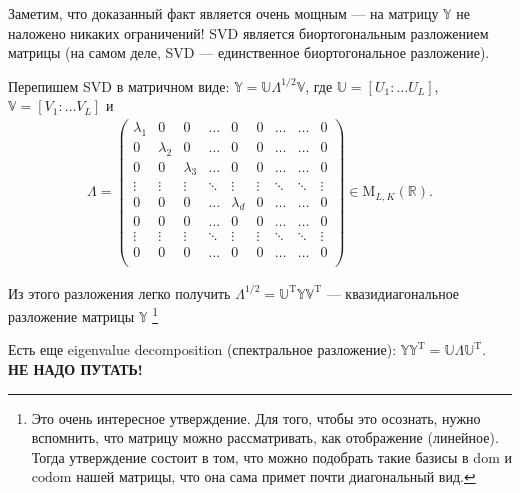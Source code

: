 Заметим, что доказанный факт является очень мощным --- на матрицу $\mathbb Y$ не наложено никаких ограничений!
SVD является биортогональным разложением матрицы (на самом деле, SVD --- единственное биортогональное разложение).

Перепишем SVD в матричном виде: $\mathbb Y = \mathbb U \Lambda^{1/2} \mathbb V$, где $\mathbb U = [U_1 \colon \ldots U_L]$, $\mathbb V = [V_1 \colon \ldots V_L]$ и
\begin{gather*}
    \Lambda = 
    \begin{pmatrix}
        \lambda_1 & 0 & 0 &\ldots & 0 & 0 & \ldots & \ldots & 0\\
        0 & \lambda_2 & 0 &\ldots & 0 & 0 & \ldots & \ldots & 0\\
        0 & 0 & \lambda_3 &\ldots & 0 & 0 & \ldots & \ldots & 0\\
        \vdots & \vdots & \vdots & \ddots & \vdots & \vdots & \ddots & \ddots & \vdots \\
        0 & 0 & 0 & \ldots & \lambda_d & 0 &  \ldots & \ldots & 0\\
        0 & 0 & 0 & \ldots & 0 & 0 &  \ldots & \ldots & 0\\
        \vdots & \vdots & \vdots & \ddots & \vdots & \vdots & \ddots & \ddots & \vdots \\
        0 & 0 & 0 & \ldots & 0 & 0 &  \ldots & \ldots & 0\\
    \end{pmatrix} \in \mathrm M_{L, K} (\mathbb R).
\end{gather*}

Из этого разложения легко получить $\Lambda^{1/2} = \mathbb U^\mathrm T \mathbb Y \mathbb V^\mathrm T$ --- квазидиагональное разложение матрицы $\mathbb Y$ \footnote{Это очень интересное утверждение.
    Для того, чтобы это осознать, нужно вспомнить, что матрицу можно рассматривать, как отображение (линейное). Тогда утверждение состоит в том, что можно подобрать такие базисы в $\mathrm {dom}$ и $\mathrm {codom}$
нашей матрицы, что она сама примет почти диагональный вид.}

Есть еще eigenvalue decomposition (спектральное разложение): $\mathbb Y \mathbb Y^\mathrm T = \mathbb U \Lambda \mathbb U^\mathrm T$. \\
\textbf{\color{red} НЕ НАДО ПУТАТЬ!}
